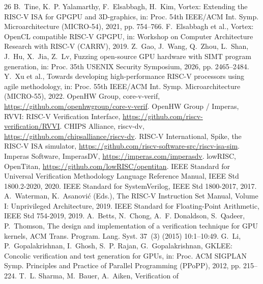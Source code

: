 \documentclass[review,12pt]{elsarticle}
\begin{document}
\begin{thebibliography}{26}
	 B.~Tine, K.~P. Yalamarthy, F.~Elsabbagh,
	H.~Kim, Vortex: Extending the RISC-V ISA for GPGPU and 3D-graphics,
	in: Proc. 54th IEEE/ACM Int. Symp. Microarchitecture (MICRO-54),
	2021, pp. 754--766.
	 F.~Elsabbagh et al., Vortex: OpenCL
	compatible RISC-V GPGPU, in: Workshop on Computer Architecture
	Research with RISC-V (CARRV), 2019.
	 Z.~Gao, J.~Wang, Q.~Zhou, L.~Shan, J.~Hu,
	X.~Jia, Z.~Lv, Fuzzing open-source GPU hardware with SIMT program
	generation, in: Proc. 35th USENIX Security Symposium, 2026,
	pp. 2465--2484.
	 Y.~Xu et al., Towards developing high-performance
	RISC-V processors using agile methodology, in: Proc. 55th
	IEEE/ACM Int. Symp. Microarchitecture (MICRO-55), 2022.
	 OpenHW Group, core-v-verif,
	\url{https://github.com/openhwgroup/core-v-verif}.
	 OpenHW Group / Imperas, RVVI: RISC-V Verification
	Interface, \url{https://github.com/riscv-verification/RVVI}.
	 CHIPS Alliance, riscv-dv,
	\url{https://github.com/chipsalliance/riscv-dv}.
	 RISC-V International, Spike, the RISC-V ISA
	simulator, \url{https://github.com/riscv-software-src/riscv-isa-sim}.
	 Imperas Software, ImperasDV,
	\url{https://imperas.com/imperasdv}.
	 lowRISC, OpenTitan,
	\url{https://github.com/lowRISC/opentitan}.
	 IEEE Standard for Universal Verification Methodology
	Language Reference Manual, IEEE Std 1800.2-2020, 2020.
	 IEEE Standard for SystemVerilog, IEEE Std 1800-2017,
	2017.
	 A.~Waterman, K.~Asanovi\'c (Eds.), The RISC-V
	Instruction Set Manual, Volume I: Unprivileged Architecture, 2019.
	 IEEE Standard for Floating-Point Arithmetic,
	IEEE Std 754-2019, 2019.
	 A.~Betts, N.~Chong, A.~F. Donaldson,
	S.~Qadeer, P.~Thomson, The design and implementation of a
	verification technique for GPU kernels, ACM Trans. Program. Lang.
	Syst. 37~(3) (2015) 10:1--10:49.
	 G.~Li, P.~Gopalakrishnan, I.~Ghosh, S.~P. Rajan,
	G.~Gopalakrishnan, GKLEE: Concolic verification and test generation
	for GPUs, in: Proc. ACM SIGPLAN Symp. Principles and Practice of
	Parallel Programming (PPoPP), 2012, pp. 215--224.
	 T.~L. Sharma, M.~Bauer, A.~Aiken, Verification of

\end{thebibliography}
\end{document}
